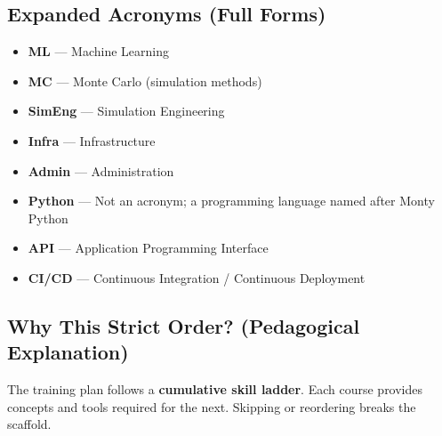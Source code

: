 \documentclass[12pt]{article}
\begin{document}
	\subsection*{Expanded Acronyms (Full Forms)}
	\begin{itemize}
		\item \textbf{ML} — Machine Learning
		\item \textbf{MC} — Monte Carlo (simulation methods)
		\item \textbf{SimEng} — Simulation Engineering
		\item \textbf{Infra} — Infrastructure
		\item \textbf{Admin} — Administration
		\item \textbf{Python} — Not an acronym; a programming language named after Monty Python
		\item \textbf{API} — Application Programming Interface
		\item \textbf{CI/CD} — Continuous Integration / Continuous Deployment
	\end{itemize}
	
	\subsection*{Why This Strict Order? (Pedagogical Explanation)}
	
	The training plan follows a \textbf{cumulative skill ladder}. Each course provides concepts and tools required for the next. Skipping or reordering breaks the scaffold.
	
\end{document}
